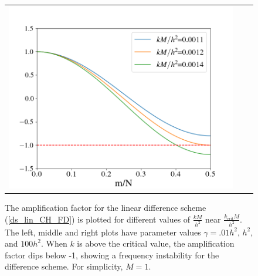 \documentclass[12pt, reqno]{report}
\theoremstyle{definition}
\theoremstyle{remark}
\begin{document}
\begin{figure}[H]
\begin{tabular}{ccc}
        \includegraphics[width = \ampwidth]{media_paper/ga100_CH_FD.png}
    \end{tabular}

    \caption{The amplification factor for the linear difference scheme (\ref{ds_lin_CH_FD}) is plotted for different values of $\frac{kM}{h^2}$ near $\frac{k_\text{crit}M}{h^2}$. The left, middle and right plots have parameter values $\gamma=.01h^2$, $h^2$, and $100h^2$. When $k$ is above the critical value, the amplification factor dips below -1, showing a frequency instability for the difference scheme. For simplicity, $M=1$.}
    \label{fg_CH_amp_FD}
\end{figure}
\end{document}
